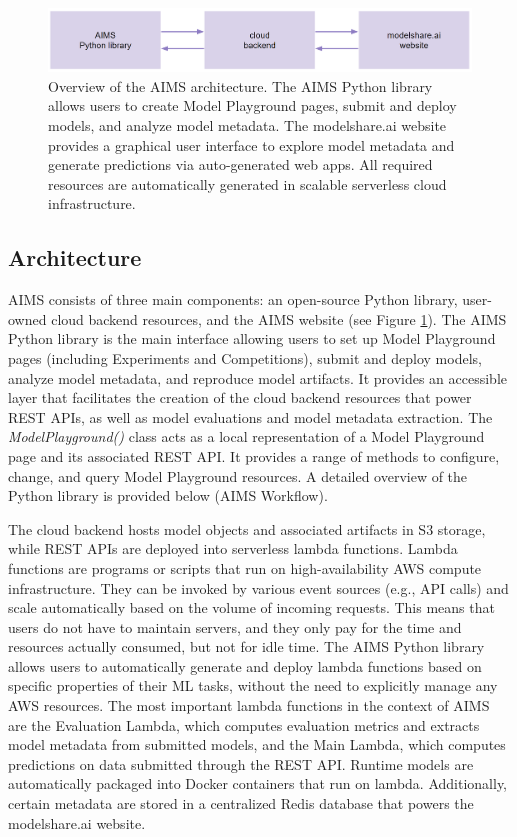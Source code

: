 \begin{figure}
  \centering
  \includegraphics[width=1\textwidth]{figures/fig_aims_architecture.png}
  \caption{Overview of the AIMS architecture. The AIMS Python library allows users to create Model Playground pages, submit and deploy models, and analyze model metadata. The modelshare.ai website provides a graphical user interface to explore model metadata and generate predictions via auto-generated web apps. All required resources are automatically generated in scalable serverless cloud infrastructure.}
  \label{fig:fig_architecture}
\end{figure}

\subsection{Architecture}
AIMS consists of three main components: an open-source Python library, user-owned cloud backend resources, and the AIMS website (see Figure \ref{fig:fig_architecture}). The AIMS Python library is the main interface allowing users to set up Model Playground pages (including Experiments and Competitions), submit and deploy models, analyze model metadata, and reproduce model artifacts. It provides an accessible layer that facilitates the creation of the cloud backend resources that power REST APIs, as well as model evaluations and model metadata extraction. The \textit{ModelPlayground()} class acts as a local representation of a Model Playground page and its associated REST API. It provides a range of methods to configure, change, and query Model Playground resources. A detailed overview of the Python library is provided below (AIMS Workflow). 

The cloud backend hosts model objects and associated artifacts in S3 storage, while REST APIs are deployed into serverless lambda functions. Lambda functions are programs or scripts that run on high-availability AWS compute infrastructure. They can be invoked by various event sources (e.g., API calls) and scale automatically based on the volume of incoming requests. This means that users do not have to maintain servers, and they only pay for the time and resources actually consumed, but not for idle time. The AIMS Python library allows users to automatically generate and deploy lambda functions based on specific properties of their ML tasks, without the need to explicitly manage any AWS resources. The most important lambda functions in the context of AIMS are the Evaluation Lambda, which computes evaluation metrics and extracts model metadata from submitted models, and the Main Lambda, which computes predictions on data submitted through the REST API. Runtime models are automatically packaged into Docker containers that run on lambda. Additionally, certain metadata are stored in a centralized Redis database that powers the modelshare.ai website.

